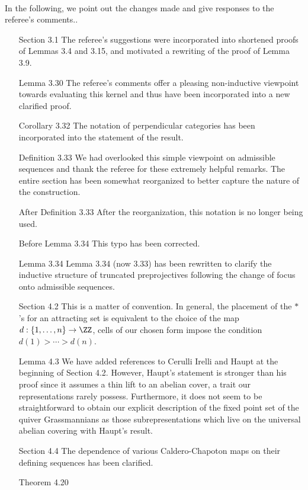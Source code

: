 \documentclass[titlepage,11pt,a4paper]{{scrartcl}}
\begin{document}
\pagestyle{empty}


\\


\noindent In the following, we point out the changes made and give responses to the referee's comments..

\renewcommand{\labelenumi}{(\arabic{enumi})}
\begin{enumerate}
  \item[Section 3.1] The referee's suggestions were incorporated into shortened proofs of Lemmas 3.4 and 3.15, and motivated a rewriting of the proof of Lemma 3.9.
  \item[Lemma 3.30] The referee's comments offer a pleasing non-inductive viewpoint towards evaluating this kernel and thus have been incorporated into a new clarified proof.
  \item[Corollary 3.32] The notation of perpendicular categories has been incorporated into the statement of the result.
  \item[Definition 3.33] We had overlooked this simple viewpoint on admissible sequences and thank the referee for these extremely helpful remarks.
    The entire section has been somewhat reorganized to better capture the nature of the construction.
  \item[After Definition 3.33] After the reorganization, this notation is no longer being used.
  \item[Before Lemma 3.34] This typo has been corrected.
  \item[Lemma 3.34] Lemma 3.34 (now 3.33) has been rewritten to clarify the inductive structure of truncated preprojectives following the change of focus onto admissible sequences.
  \item[Section 4.2] This is a matter of convention.
    In general, the placement of the $*$'s for an attracting set is equivalent to the choice of the map $d:\{1,\ldots,n\}\to\ZZ$, cells of our chosen form impose the condition $d(1)>\cdots>d(n)$.
  \item[Lemma 4.3] We have added references to Cerulli Irelli and Haupt at the beginning of Section 4.2.
    However, Haupt's statement is stronger than his proof since it assumes a thin lift to an abelian cover, a trait our representations rarely possess.
    Furthermore, it does not seem to be straightforward to obtain our explicit description of the fixed point set of the quiver Grassmannians as those subrepresentations which live on the universal abelian covering with Haupt's result. 
  \item[Section 4.4] The dependence of various Caldero-Chapoton maps on their defining sequences has been clarified.
  \item[Theorem 4.20] 
\end{enumerate}
\end{document}
